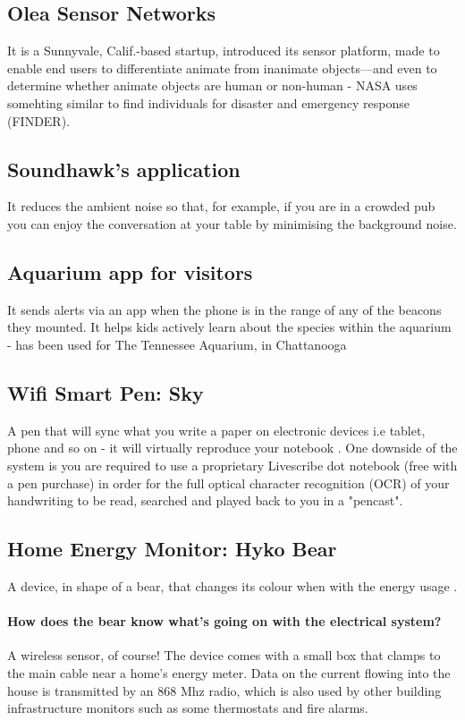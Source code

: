 \documentclass[12pt]{article}
\begin{document}
  \subsection {Olea Sensor Networks} It is a Sunnyvale, Calif.-based startup, introduced its sensor platform, made to enable end users to differentiate animate from inanimate objects—and even to determine whether animate objects are human or non-human -  NASA uses somehting similar to find individuals for disaster and emergency response (FINDER)\cite{olea}.

\subsection {Soundhawk's application} It reduces the ambient noise so that, for example, if you are in a crowded pub you can enjoy the conversation at your table by minimising the background noise.

 \subsection {Aquarium app for visitors} It sends alerts via an app when the phone is in the range of any of the beacons they mounted. It helps kids actively learn about the species within the aquarium -  has been used for The Tennessee Aquarium, in Chattanooga \cite{norman}

\subsection {Wifi Smart Pen: Sky}
A pen that will sync what you write a paper on electronic devices i.e tablet, phone and so on - it will virtually reproduce your notebook \cite {pen}.  One downside of the system is you are required to use a proprietary Livescribe dot notebook (free with a pen purchase) in order for the full optical character recognition (OCR) of your handwriting to be read, searched and played back to you in a "pencast".
\subsection {Home Energy Monitor: Hyko Bear} A device, in shape of a bear, that changes its colour when with the energy usage \cite{bear}. 

\paragraph {How does the bear know what’s going on with the electrical system?} A wireless sensor, of course! The device comes with a small box that clamps to the main cable near a home’s energy meter. Data on the current flowing into the house is transmitted by an 868 Mhz radio, which is also used by other building infrastructure monitors such as some thermostats and fire alarms.
\end{document}

